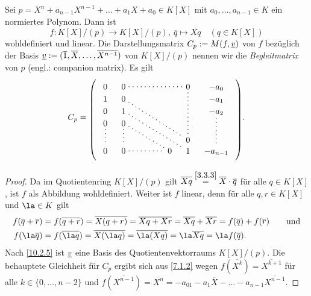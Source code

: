 \documentclass[../../main.tex]{subfiles}
\begin{document}
\begin{propdef}\label{10.2.6}
Sei $p=X^n+a_{n-1}X^{n-1}+\ldots+a_1X+a_0\in K[X]$ mit $a_0,\dots,a_{n-1}\in K$ ein normiertes Polynom. Dann ist
\[f\colon K[X]/(p)\to K[X]/(p),\ \overline q\mapsto\overline{Xq}\quad(q\in K[X])\]
wohldefiniert und linear. Die Darstellungsmatrix $C_p:=M(f,{\underline v})$ von $f$ bezüglich der Basis ${\underline v}:=(\overline1,\overline X,\dots,\overline{X^{n-1}})$ von $K[X]/(p)$
nennen wir die \emph{Begleitmatrix} von $p$ (engl.: companion matrix). Es gilt
\[C_p=
\begin{tikzpicture}[loosely dotted,thick,baseline]
\matrix (m) [matrix of math nodes,nodes in empty cells,right delimiter=),left delimiter=(,column sep=1em]{
0&0&&&&0&-a_0\\
1&0&&&&  &-a_1\\
0&1&&&&  &-a_2\\
0&0\\
\\
 &   &&&&0\\
0&0&&&0&1&-a_{n-1}\\
} ;
\draw (m-1-2)-- (m-1-6);
\draw (m-2-2)-- (m-6-6);
\draw (m-3-2)-- (m-7-6);
\draw (m-4-2)-- (m-7-5);
\draw (m-1-6)-- (m-6-6);
\draw (m-3-7)-- (m-7-7);
\draw (m-4-1)-- (m-7-1);
\draw (m-4-2)-- (m-7-2) -- (m-7-5);
\end{tikzpicture}.
\]
\end{propdef}

\begin{proof}
Da im Quotientenring $K[X]/(p)$ gilt $\overline{Xq}\overset{\ref{3.3.3}}=\overline X\cdot\overline q$ für alle $q\in K[X]$, ist $f$ als Abbildung wohldefiniert.
Weiter ist $f$ linear, denn für alle $q,r\in K[X]$ und $\la\in K$ gilt
\begin{align*}
f(\overline q+\overline r)&=f(\overline{q+r})=\overline{X(q+r)}=\overline{Xq+Xr}=\overline{Xq}+\overline{Xr}=f(\overline q)+f(\overline r)\qquad\text{und}\\
f(\la\overline q)&=f(\overline{\la q})=\overline{X(\la q)}=\overline{\la(Xq)}=\la\overline{Xq}=\la f(\overline q).
\end{align*}
Nach \ref{10.2.5} ist ${\underline v}$ eine Basis des Quotientenvektorraums $K[X]/(p)$. Die behauptete Gleichheit für $C_p$ ergibt sich aus \ref{7.1.2} wegen
$f(\overline{X^k})=\overline{X^{k+1}}$ für alle $k\in\{0,\dots,n-2\}$ und $f(\overline{X^{n-1}})=\overline{X^n}=-a_01-a_1\overline X-\ldots-a_{n-1}\overline{X^{n-1}}$.
\end{proof}
\end{document}
